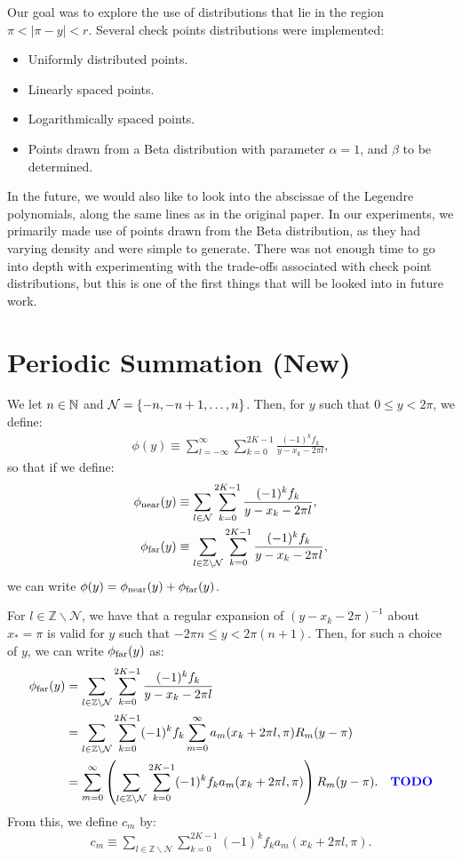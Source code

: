 Our goal was to explore the use of distributions that lie in the
region $\pi < |\pi - y| < r$. Several check points distributions were
implemented:
\begin{itemize}
\item Uniformly distributed points.
\item Linearly spaced points.
\item Logarithmically spaced points.
\item Points drawn from a Beta distribution with parameter
  $\alpha = 1$, and $\beta$ to be determined.
\end{itemize}
In the future, we would also like to look into the abscissae of the
Legendre polynomials, along the same lines as in the original
paper. In our experiments, we primarily made use of points drawn from
the Beta distribution, as they had varying density and were simple to
generate. There was not enough time to go into depth with
experimenting with the trade-offs associated with check point
distributions, but this is one of the first things that will be looked
into in future work.

\section{Periodic Summation (New)}

We let $n \in \mathbb{N}$ and $\mathcal{N} = \left\{-n, -n+1, \hdots,
  n\right\}$. Then, for $y$ such that $0 \leq y < 2\pi$, we define:
\begin{align*}
  \phi(y) \equiv \sum_{l=-\infty}^{\infty} \sum_{k=0}^{2K-1} \frac{(-1)^k f_k}{y - x_k - 2\pi l},
\end{align*}
so that if we define:
\begin{align*}
  \phi_{\operatorname{near}}(y) &\equiv \sum_{l \in \mathcal{N}} \sum_{k=0}^{2K-1} \frac{(-1)^k f_k}{y - x_k - 2\pi l}, \\
  \phi_{\operatorname{far}}(y) &\equiv \sum_{l \in \mathbb{Z} \backslash \mathcal{N}} \sum_{k=0}^{2K-1} \frac{(-1)^k f_k}{y - x_k - 2\pi l},
\end{align*}
we can write $\phi(y) = \phi_{\operatorname{near}}(y) + \phi_{\operatorname{far}}(y)$.

For $l \in \mathbb{Z} \backslash \mathcal{N}$, we have that a regular
expansion of $(y - x_k - 2\pi)^{-1}$ about $x_* = \pi$ is valid for
$y$ such that $-2\pi n \leq y < 2\pi(n+1)$. Then, for such a choice of
$y$, we can write $\phi_{\operatorname{far}}(y)$ as:
\begin{align*}
  \phi_{\operatorname{far}}(y) &= \sum_{l \in \mathbb{Z} \backslash \mathcal{N}} \sum_{k=0}^{2K-1} \frac{(-1)^k f_k}{y - x_k - 2\pi l} \\
  &= \sum_{l \in \mathbb{Z} \backslash \mathcal{N}} \sum_{k=0}^{2K-1} (-1)^k f_k \sum_{m=0}^\infty a_m(x_k + 2\pi l, \pi) R_m(y - \pi) \\
  &= \sum_{m=0}^\infty \left(\sum_{l \in \mathbb{Z} \backslash \mathcal{N}} \sum_{k=0}^{2K-1} (-1)^k f_k a_m(x_k + 2\pi l, \pi)\right) R_m(y - \pi). & \mbox{\color{blue}{\textbf{TODO}}}
\end{align*}
From this, we define $c_m$ by:
\begin{align*}
  c_m \equiv \sum_{l \in \mathbb{Z} \backslash \mathcal{N}} \sum_{k=0}^{2K-1} (-1)^k f_k a_m(x_k + 2\pi l, \pi).
\end{align*}

